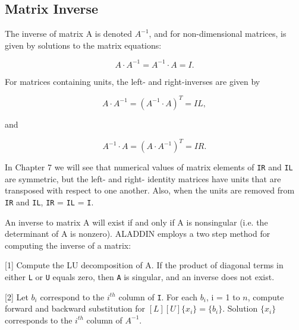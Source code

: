 \subsection{Matrix Inverse}

\vspace{0.15 in}
\noindent\hspace{0.5 in}
The inverse of matrix A is denoted $A^{-1}$, and for non-dimensional matrices,
is given by solutions to the matrix equations:

\begin{equation}
A \cdot A^{-1} = A^{-1} \cdot A = I.
\label{eq: inverse-part1}
\end{equation}

\vspace{0.10 in}\noindent
For matrices containing units, the left- and right-inverses are given by

\begin{equation}
A \cdot A^{-1} = \left( {A^{-1} \cdot A} \right)^T = IL,
\label{eq: inverse-part2}
\end{equation}

\noindent
and

\begin{equation}
A^{-1} \cdot A = \left( {A \cdot A^{-1}} \right)^T = IR.
\label{eq: inverse-part3}
\end{equation}

\vspace{0.10 in}\noindent
In Chapter 7 we will see that numerical values of
matrix elements of {\tt IR} and {\tt IL} are symmetric,
but the left- and right- identity matrices have units
that are transposed with respect to one another.  Also, when the units
are removed from {\tt IR} and {\tt IL}, {\tt IR} = {\tt IL} = {\tt I}.

\vspace{0.15 in}
\noindent\hspace{0.5 in}
An inverse to matrix A will exist if and only
if A is nonsingular (i.e. the determinant of A is nonzero).
ALADDIN employs a two step method for computing the inverse of a matrix:

\begin{description} 
\item {[1]}
Compute the LU decomposition of A. If the product of diagonal
terms in either {\tt L} or {\tt U} equals zero, then {\tt A}
is singular, and an inverse does not exist.
\item {[2]}
Let $b_i$ correspond to the $i^{th}$ column of {\tt I}.
For each $b_i$, i = 1 to $n$, compute forward and backward substitution
for $[L][U] \{ x_i \} = \{ b_i \}$. Solution $\{ x_i \}$ corresponds to
the $i^{th}$ column of $A^{-1}$.
\end{description} 

